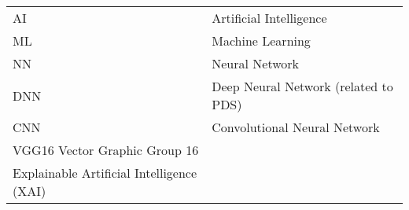%
%
%
%

\begin{acronyms}

\renewcommand{\arraystretch}{1.5}
\setlength{\tabcolsep}{3mm}
{\begin {tabular}{ll}
AI & Artificial Intelligence\\
ML &Machine Learning\\
NN &Neural Network\\
DNN &Deep Neural Network (related to PDS)\\
CNN &Convolutional Neural Network\\
VGG16 Vector Graphic Group 16\\

Explainable Artificial Intelligence (XAI) 
\end {tabular}}

\end{acronyms}
